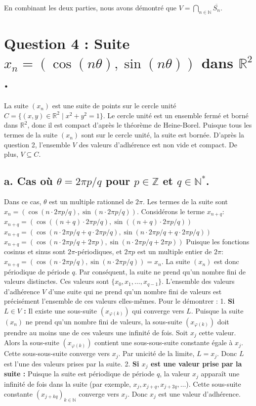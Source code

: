 \documentclass{report}
\begin{document}
En combinant les deux parties, nous avons démontré que $V = \bigcap_{n \in \mathbb{N}} \overline{S_n}$.

\section*{Question 4 : Suite $x_n = (\cos(n\theta), \sin(n\theta))$ dans $\mathbb{R}^2$.}

La suite $(x_n)$ est une suite de points sur le cercle unité $C = \{(x,y) \in \mathbb{R}^2 \mid x^2+y^2=1\}$.
Le cercle unité est un ensemble fermé et borné dans $\mathbb{R}^2$, donc il est compact d'après le théorème de Heine-Borel.
Puisque tous les termes de la suite $(x_n)$ sont sur le cercle unité, la suite est bornée.
D'après la question 2, l'ensemble $V$ des valeurs d'adhérence est non vide et compact. De plus, $V \subseteq C$.

\subsection*{a. Cas où $\theta = 2\pi p/q$ pour $p \in \mathbb{Z}$ et $q \in \mathbb{N}^*$.}

Dans ce cas, $\theta$ est un multiple rationnel de $2\pi$.
Les termes de la suite sont $x_n = (\cos(n \cdot 2\pi p/q), \sin(n \cdot 2\pi p/q))$.
Considérons le terme $x_{n+q}$:
$x_{n+q} = (\cos((n+q) \cdot 2\pi p/q), \sin((n+q) \cdot 2\pi p/q))$
$x_{n+q} = (\cos(n \cdot 2\pi p/q + q \cdot 2\pi p/q), \sin(n \cdot 2\pi p/q + q \cdot 2\pi p/q))$
$x_{n+q} = (\cos(n \cdot 2\pi p/q + 2\pi p), \sin(n \cdot 2\pi p/q + 2\pi p))$
Puisque les fonctions cosinus et sinus sont $2\pi$-périodiques, et $2\pi p$ est un multiple entier de $2\pi$:
$x_{n+q} = (\cos(n \cdot 2\pi p/q), \sin(n \cdot 2\pi p/q)) = x_n$.
La suite $(x_n)$ est donc périodique de période $q$.
Par conséquent, la suite ne prend qu'un nombre fini de valeurs distinctes. Ces valeurs sont $\{x_0, x_1, \dots, x_{q-1}\}$.
L'ensemble des valeurs d'adhérence $V$ d'une suite qui ne prend qu'un nombre fini de valeurs est précisément l'ensemble de ces valeurs elles-mêmes.
Pour le démontrer :
1.  \textbf{Si $L \in V$ :} Il existe une sous-suite $(x_{\varphi(k)})$ qui converge vers $L$. Puisque la suite $(x_n)$ ne prend qu'un nombre fini de valeurs, la sous-suite $(x_{\varphi(k)})$ doit prendre au moins une de ces valeurs une infinité de fois. Soit $x_j$ cette valeur. Alors la sous-suite $(x_{\varphi(k)})$ contient une sous-sous-suite constante égale à $x_j$. Cette sous-sous-suite converge vers $x_j$. Par unicité de la limite, $L = x_j$. Donc $L$ est l'une des valeurs prises par la suite.
2.  \textbf{Si $x_j$ est une valeur prise par la suite :} Puisque la suite est périodique de période $q$, la valeur $x_j$ apparaît une infinité de fois dans la suite (par exemple, $x_j, x_{j+q}, x_{j+2q}, \dots$). Cette sous-suite constante $(x_{j+kq})_{k \in \mathbb{N}}$ converge vers $x_j$. Donc $x_j$ est une valeur d'adhérence.
\end{document}
